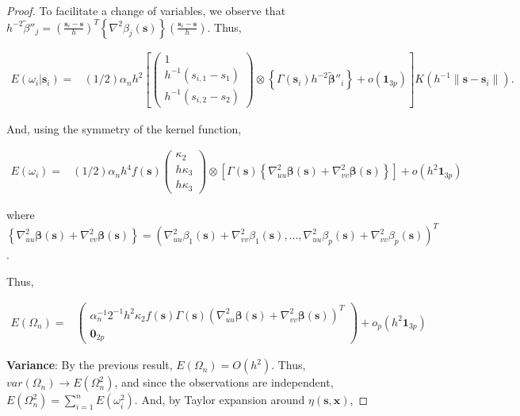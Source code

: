 \documentclass[authoryear,review, 12pt]{elsarticle}
\begin{document}
\begin{proof}
To facilitate a change of variables, we observe that $h^{-2}\tilde{\beta}''_{j}=\left(\frac{\bm{s}_{i}-\bm{s}}{h}\right)^{T}\left\{ \nabla^{2}\beta_{j}(\bm{s})\right\} \left(\frac{\bm{s}_{i}-\bm{s}}{h}\right)$.
Thus,

\begin{align*}
E\left(\omega_{i}|\bm{s}_{i}\right)= & \left(1/2\right)\alpha_{n}h^{2}\left[\left(\begin{array}{c}
1\\
h^{-1}(s_{i,1}-s_{1})\\
h^{-1}(s_{i,2}-s_{2})
\end{array}\right)\otimes\left\{ \Gamma(\bm{s}_{i})h^{-2}\tilde{\bm{\beta}}''_{i}\right\} +o\left(\bm{1}_{3p}\right)\right]K\left(h^{-1}\|\bm{s}-\bm{s}_{i}\|\right).
\end{align*}


And, using the symmetry of the kernel function,

\begin{align*}
E\left(\omega_{i}\right)= & (1/2)\alpha_{n}h^{4}f\left(\bm{s}\right)\left(\begin{array}{c}
\kappa_{2}\\
h\kappa_{3}\\
h\kappa_{3}
\end{array}\right)\otimes\left[\Gamma(\bm{s})\left\{ \nabla_{uu}^{2}\bm{\beta}(\bm{s})+\nabla_{vv}^{2}\bm{\beta}(\bm{s})\right\} \right]+o\left(h^{2}\bm{1}_{3p}\right)
\end{align*}


where $\left\{ \nabla_{uu}^{2}\bm{\beta}(\bm{s})+\nabla_{vv}^{2}\bm{\beta}(\bm{s})\right\} =\left(\nabla_{uu}^{2}\beta_{1}(\bm{s})+\nabla_{vv}^{2}\beta_{1}(\bm{s}),\dots,\nabla_{uu}^{2}\beta_{p}(\bm{s})+\nabla_{vv}^{2}\beta_{p}(\bm{s})\right)^{T}$.

Thus,

\begin{align*}
E\left(\Omega_{n}\right)= & \left(\begin{array}{c}
\alpha_{n}^{-1}2^{-1}h^{2}\kappa_{2}f(\bm{s})\Gamma(\bm{s})\left(\nabla_{uu}^{2}\bm{\beta}(\bm{s})+\nabla_{vv}^{2}\bm{\beta}(\bm{s})\right)^{T}\\
\bm{0}_{2p}
\end{array}\right)+o_{p}\left(h^{2}\bm{1}_{3p}\right)
\end{align*}


\textbf{Variance}: By the previous result, $E\left(\Omega_{n}\right)=O\left(h^{2}\right)$.
Thus, $var\left(\Omega_{n}\right)\to E\left(\Omega_{n}^{2}\right)$,
and since the observations are independent, $E\left(\Omega_{n}^{2}\right)=\sum_{i=1}^{n}E\left(\omega_{i}^{2}\right)$.
And, by Taylor expansion around $\eta(\bm{s},\bm{x})$, 


\end{proof}
\end{document}
